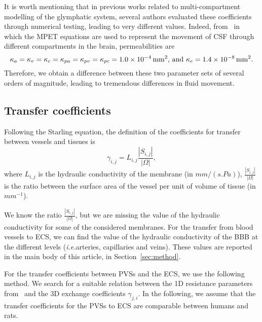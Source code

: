 \documentclass[a4paper,11pt]{article}
\newcommand{\ie}{\emph{i.e.}\;}
\newcommand{\1}{^{(1)}}
\newcommand{\2}{^{(2)}}
\newcommand{\abs}[1]{\left\lvert#1\right\rvert}
\begin{document}
It is worth mentioning that in previous works related to multi-compartment modelling of the glymphatic system, several authors evaluated these coefficients through numerical testing, leading to very different values. Indeed, from~\cite{tully_ventikos_2011,Guo-2019-MPET,eliseussen2021posteriori} in which the MPET equations are used to represent the movement of CSF through different compartments in the brain, permeabilities are 
\[
    \kappa_{a} = \kappa_v = \kappa_{c}  = \kappa_{pa} = \kappa_{pv} = \kappa_{pc}  = 1.0 \times 10^{-4}\,\text{\si{mm^2}, and } \kappa_e = 1.4\times 10^{-8} \, \text{\si{mm^2}}.
\]
Therefore, we obtain a difference between these two parameter sets of several orders of magnitude, leading to tremendous differences in fluid movement. 



\subsection{Transfer coefficients}




Following the Starling equation, the definition of the coefficients for transfer between vessels and tissues is
\begin{equation}
    \gamma_{i, j} = L_{i,j} \frac{\abs{S_{i,j}}}{\abs{\Omega}}, 
    \label{eq:mass-transfer-convect}
\end{equation}
where $L_{i,j}$ is the hydraulic conductivity of the membrane (in $\si{mm /(s. Pa)}$), $\frac{\abs{S_{i,j}}}{\abs{\Omega}}$ is the ratio between the surface area of the vessel per unit of volume of tissue (in $\si{mm^{-1}}$). 

We know the ratio $\frac{\abs{S_{i,j}}}{\abs{\Omega}}$, but we are missing the value of the hydraulic conductivity for some of the considered membranes. For the transfer from blood vessels to ECS, we can find the value of the hydraulic conductivity of the BBB at the different levels (\ie arteries, capillaries and veins). These values are reported in the main body of this article, in Section~\ref{sec:method}.

For the transfer coefficients between PVSs and the ECS, we use the following method. We search for a suitable relation between the 1D resistance parameters from~\cite{Vinje-2020-ICP} and the 3D exchange coefficients $\gamma_{j, i}$. 
In the following, we assume that the transfer coefficients for the PVSs to ECS are comparable between humans and rats.
\end{document}

